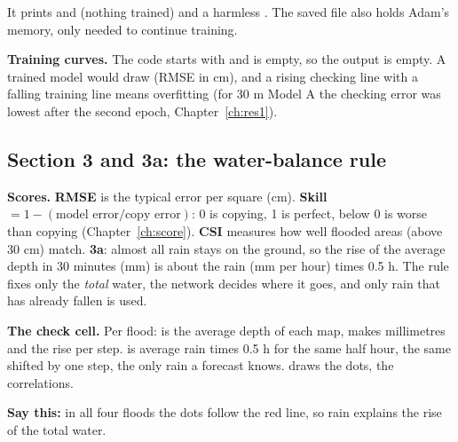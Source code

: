 It prints  and  (nothing trained) and a harmless . The saved file also holds Adam's memory, only needed to continue training.

\textbf{Training curves.} The code starts with  and  is empty, so the output is empty. A trained model would draw  (RMSE in cm), and a rising checking line with a falling training line means overfitting (for 30 m Model A the checking error was lowest after the second epoch, Chapter~\ref{ch:res1}).


\subsection{Section 3 and 3a: the water-balance rule}

\textbf{Scores.} \textbf{RMSE} is the typical error per square (cm). \textbf{Skill} $= 1 - (\text{model error}/\text{copy error})$: 0 is copying, 1 is perfect, below 0 is worse than copying (Chapter~\ref{ch:score}). \textbf{CSI} measures how well flooded areas (above 30 cm) match. \textbf{3a}: almost all rain stays on the ground, so the rise of the average depth in 30 minutes (mm) is about the rain (mm per hour) times 0.5 h. The rule fixes only the \emph{total} water, the network decides where it goes, and only rain that has already fallen is used.

\textbf{The check cell.} Per flood:  is the average depth of each map,  makes millimetres and  the rise per step.  is average rain times 0.5 h for the same half hour,  the same shifted by one step, the only rain a forecast knows.  draws the dots,  the correlations. 

\textbf{Say this:} in all four floods the dots follow the red line, so rain explains the rise of the total water. 

